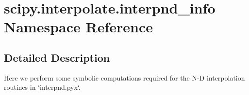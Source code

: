 \hypertarget{namespacescipy_1_1interpolate_1_1interpnd__info}{}\section{scipy.\+interpolate.\+interpnd\+\_\+info Namespace Reference}
\label{namespacescipy_1_1interpolate_1_1interpnd__info}


\subsection{Detailed Description}
\begin{DoxyVerb}Here we perform some symbolic computations required for the N-D
interpolation routines in `interpnd.pyx`.\end{DoxyVerb}
 